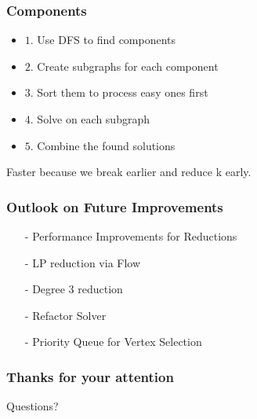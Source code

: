 \documentclass{beamer}[12pt]
\begin{document}
\begin{frame}
\frametitle{Components}
\begin{itemize}
	\item $1$. Use DFS to find components
	\item $2$. Create subgraphs for each component
	\item $3$. Sort them to process easy ones first
	\item $4$. Solve on each subgraph
	\item $5$. Combine the found solutions
\end{itemize}
\vspace{5mm}
Faster because we break earlier and reduce k early.

\end{frame}


\begin{frame}
\frametitle{Outlook on Future Improvements}

\begin{itemize}
	\item[-] Performance Improvements for Reductions
	\item[-] LP reduction via Flow
	\item[-] Degree 3 reduction
	\item[-] Refactor Solver
	\item[-] Priority Queue for Vertex Selection
\end{itemize}




\end{frame}
\begin{frame}
\frametitle{Thanks for your attention}
\centering	\Huge Questions?
\end{frame}
\end{document}
